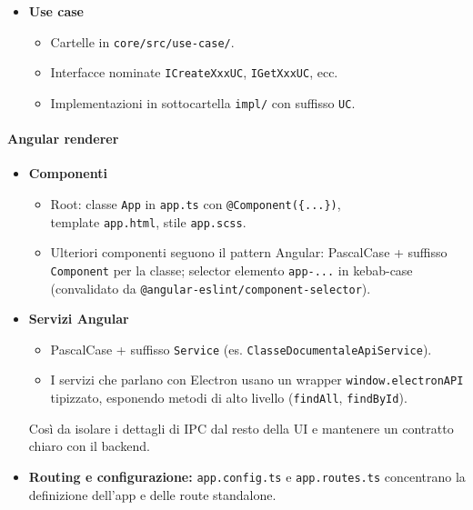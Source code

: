 \documentclass[a4paper,12pt]{article}
\begin{document}
\begin{itemize}
  \item \textbf{Use case}
    \begin{itemize}
      \item Cartelle in \texttt{core/src/use-case/}.
      \item Interfacce nominate \texttt{ICreateXxxUC}, \texttt{IGetXxxUC}, ecc.
      \item Implementazioni in sottocartella \texttt{impl/} con suffisso \texttt{UC}.
    \end{itemize}
\end{itemize}

\paragraph{Angular renderer}

\begin{itemize}
  \item \textbf{Componenti}
    \begin{itemize}
      \item Root: classe \texttt{App} in \texttt{app.ts} con \texttt{@Component(\{...\})}, \\ template \texttt{app.html}, stile \texttt{app.scss}.
      \item Ulteriori componenti seguono il pattern Angular: PascalCase + suffisso \texttt{Component} per la classe; selector elemento \texttt{app-...} in kebab-case (convalidato da \texttt{@angular-eslint/component-selector}).
    \end{itemize}

  \item \textbf{Servizi Angular}
    \begin{itemize}
      \item PascalCase + suffisso \texttt{Service} (es. \texttt{ClasseDocumentaleApiService}).
      \item I servizi che parlano con Electron usano un wrapper \texttt{window.electronAPI} tipizzato, esponendo metodi di alto livello (\texttt{findAll}, \texttt{findById}).
    \end{itemize}
    Così da isolare i dettagli di IPC dal resto della UI e mantenere un contratto chiaro con il backend.

  \item \textbf{Routing e configurazione: }\texttt{app.config.ts} e \texttt{app.routes.ts} concentrano la definizione dell'app e delle route standalone. \\
\end{itemize}
\end{document}
